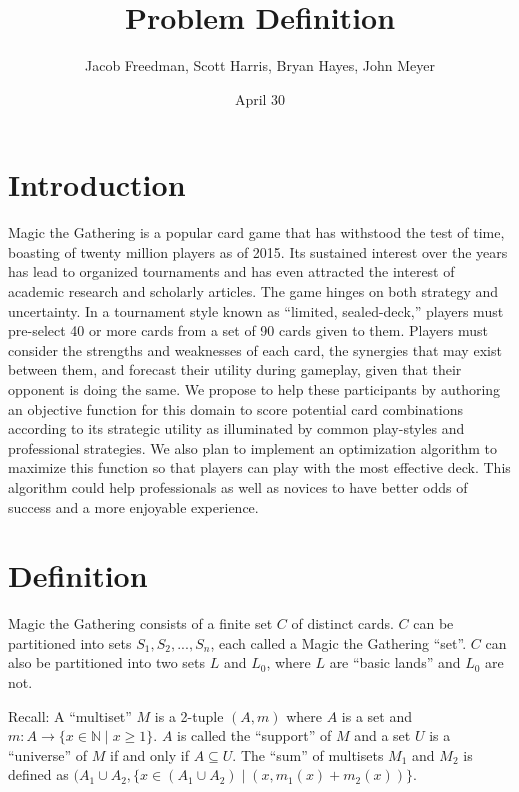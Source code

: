 \documentclass[12pt, letterpaper]{article}
\title{Problem Definition}
\date{April 30}
\author{Jacob Freedman, Scott Harris, Bryan Hayes, John Meyer}
\begin{document}
\maketitle

\section{Introduction}

Magic the Gathering is a popular card game that has withstood the test of time,
boasting of twenty million players as of 2015.
Its sustained interest over the years has lead to organized tournaments
and has even attracted the interest of academic research and scholarly articles.
The game hinges on both strategy and uncertainty.
In a tournament style known as \enquote{limited, sealed-deck,}
players must pre-select 40 or more cards from a set of 90 cards given to them.
Players must consider the strengths and weaknesses of each card,
the synergies that may exist between them,
and forecast their utility during gameplay,
given that their opponent is doing the same.
We propose to help these participants by authoring an objective function for this
domain to score potential card combinations according to its strategic utility
as illuminated by common play-styles and professional strategies.
We also plan to implement an optimization algorithm to maximize this function
so that players can play with the most effective deck.
This algorithm could help professionals as well as novices to have better odds of success
and a more enjoyable experience.

\section{Definition}

Magic the Gathering consists of a finite set $ C $ of distinct cards.
$ C $ can be partitioned into sets $ S_1, S_2, ..., S_n $, each called a Magic the Gathering \enquote{set}.
$ C $ can also be partitioned into two sets $ L $ and $ L_0 $, where $ L $ are \enquote{basic lands} and $ L_0 $ are not.

Recall: A \enquote{multiset} $ M $ is a 2-tuple $ (A, m) $
where $ A $ is a set and $ m: A \rightarrow \{x \in \mathbb{N} \mid x \ge 1 \} $.
$ A $ is called the \enquote{support} of $ M $ and
a set $ U $ is a \enquote{universe} of $ M $ if and only if $ A \subseteq U $.
The \enquote{sum} of multisets $ M_1 $ and $ M_2 $ is defined as
$ (A_1 \cup A_2, \{ x \in (A_1 \cup A_2) \mid (x, m_1(x) + m_2(x)) \} $.
\end{document}
